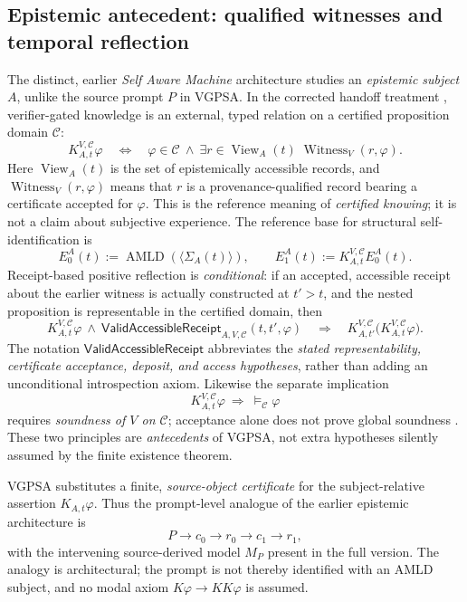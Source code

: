 \documentclass[11pt]{article}
\theoremstyle{remark}
\newcommand{\View}{\operatorname{View}}
\newcommand{\Witness}{\operatorname{Witness}}
\newcommand{\AMLD}{\operatorname{AMLD}}
\begin{document}
\subsection{Epistemic antecedent: qualified witnesses and temporal reflection}
\label{sec:epistemic-antecedent}
The distinct, earlier \emph{Self Aware Machine} architecture studies an
\emph{epistemic subject} $A$, unlike the source prompt $P$ in VGPSA. In the
corrected handoff treatment \cite{handoffatlas}, verifier-gated knowledge is
an external, typed relation on a certified proposition domain $\mathcal C$:
\begin{equation}\label{eq:reference-K}
K_{A,t}^{V,\mathcal C}\varphi
\quad\Longleftrightarrow\quad
\varphi\in\mathcal C\ \wedge\
\exists r\in\View_A(t)\;\Witness_V(r,\varphi).
\end{equation}
Here $\View_A(t)$ is the set of epistemically accessible records, and
$\Witness_V(r,\varphi)$ means that $r$ is a provenance-qualified record
bearing a certificate accepted for $\varphi$. This is the reference meaning
of \emph{certified knowing}; it is not a claim about subjective experience.
The reference base for structural self-identification is
\[
E_0^A(t):=\AMLD(\langle\Sigma_A(t)\rangle),\qquad
E_1^A(t):=K_{A,t}^{V,\mathcal C}E_0^A(t).
\]
Receipt-based positive reflection is \emph{conditional}: if an accepted,
accessible receipt about the earlier witness is actually constructed at
$t'>t$, and the nested proposition is representable in the certified domain,
then
\begin{equation}\label{eq:receipt-principle}
K_{A,t}^{V,\mathcal C}\varphi
\ \wedge\ \mathsf{ValidAccessibleReceipt}_{A,V,\mathcal C}
  (t,t',\varphi)
\quad\Longrightarrow\quad
K_{A,t'}^{V,\mathcal C}\bigl(K_{A,t}^{V,\mathcal C}\varphi\bigr).
\end{equation}
The notation $\mathsf{ValidAccessibleReceipt}$ abbreviates the
\emph{stated representability, certificate acceptance, deposit, and access
hypotheses}, rather than adding an unconditional introspection axiom.
Likewise the separate implication
\[
K_{A,t}^{V,\mathcal C}\varphi\ \Longrightarrow\ \models_{\mathcal C}\varphi
\]
requires \emph{soundness of $V$ on $\mathcal C$}; acceptance alone does not
prove global soundness \cite{handoffatlas}. These two principles are
\emph{antecedents} of VGPSA, not extra hypotheses silently assumed by the
finite existence theorem.

VGPSA substitutes a finite, \emph{source-object certificate} for the
subject-relative assertion $K_{A,t}\varphi$. Thus the prompt-level analogue
of the earlier epistemic architecture is
\[
P\longrightarrow c_0\longrightarrow r_0
\longrightarrow c_1\longrightarrow r_1,
\]
with the intervening source-derived model $M_P$ present in the full version.
The analogy is architectural; the prompt is not thereby identified with an
AMLD subject, and no modal axiom $K\varphi\to KK\varphi$ is assumed.
\end{document}
